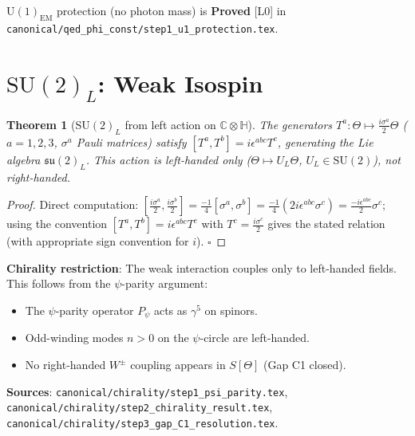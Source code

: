 \documentclass[11pt,a4paper]{article}
\newtheorem{theorem}{Theorem}[section]
\theoremstyle{definition}
\theoremstyle{remark}
\begin{document}
\begin{tcolorbox}[colback=green!4!white,colframe=green!50!black,title=Status]
$\mathrm{U}(1)_{\mathrm{EM}}$ protection (no photon mass) is \textbf{Proved} [L0]
in \texttt{canonical/qed\_phi\_const/step1\_u1\_protection.tex}.
\end{tcolorbox}

\section{$\mathrm{SU}(2)_L$: Weak Isospin}\label{sec:su2}

\begin{theorem}[$\mathrm{SU}(2)_L$ from left action on $\mathbb{C}\otimes\mathbb{H}$]
\label{thm:su2}
The generators $T^a: \Theta \mapsto \frac{i\sigma^a}{2}\Theta$
($a = 1,2,3$, $\sigma^a$ Pauli matrices) satisfy
$[T^a, T^b] = i\epsilon^{abc}T^c$,
generating the Lie algebra $\mathfrak{su}(2)_L$.
This action is \emph{left}-handed only ($\Theta \mapsto U_L\Theta$,
$U_L \in \mathrm{SU}(2)$), not right-handed.
\end{theorem}

\begin{proof}
Direct computation: $[\frac{i\sigma^a}{2}, \frac{i\sigma^b}{2}]
= \frac{-1}{4}[\sigma^a, \sigma^b] = \frac{-1}{4}(2i\epsilon^{abc}\sigma^c)
= \frac{-i\epsilon^{abc}}{2}\sigma^c$;
using the convention $[T^a,T^b] = i\epsilon^{abc}T^c$
with $T^c = \frac{i\sigma^c}{2}$ gives the stated relation (with appropriate
sign convention for $i$). $\square$
\end{proof}

\noindent\textbf{Chirality restriction}: The weak interaction couples only to
left-handed fields. This follows from the $\psi$-parity argument:
\begin{itemize}
  \item The $\psi$-parity operator $P_\psi$ acts as $\gamma^5$ on spinors.
  \item Odd-winding modes $n > 0$ on the $\psi$-circle are left-handed.
  \item No right-handed $W^\pm$ coupling appears in $S[\Theta]$ (Gap C1 closed).
\end{itemize}

\noindent\textbf{Sources}: \texttt{canonical/chirality/step1\_psi\_parity.tex},
\texttt{canonical/chirality/step2\_chirality\_result.tex},
\texttt{canonical/chirality/step3\_gap\_C1\_resolution.tex}.
\end{document}
